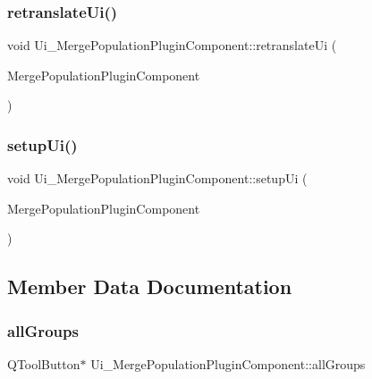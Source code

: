 \subsubsection{\texorpdfstring{retranslateUi()}{retranslateUi()}}
{\footnotesize\ttfamily void Ui\+\_\+\+Merge\+Population\+Plugin\+Component\+::retranslate\+Ui (\begin{DoxyParamCaption}\item[{Q\+Widget $\ast$}]{Merge\+Population\+Plugin\+Component }\end{DoxyParamCaption})\hspace{0.3cm}{\ttfamily [inline]}}

\mbox{\label{class_ui___merge_population_plugin_component_a96660923bcf4f8084e877b65cbbad016}} 
\subsubsection{\texorpdfstring{setupUi()}{setupUi()}}
{\footnotesize\ttfamily void Ui\+\_\+\+Merge\+Population\+Plugin\+Component\+::setup\+Ui (\begin{DoxyParamCaption}\item[{Q\+Widget $\ast$}]{Merge\+Population\+Plugin\+Component }\end{DoxyParamCaption})\hspace{0.3cm}{\ttfamily [inline]}}



\subsection{Member Data Documentation}
\mbox{\label{class_ui___merge_population_plugin_component_a01428cd132c2e7037e9074e06f2bf84f}} 
\subsubsection{\texorpdfstring{allGroups}{allGroups}}
{\footnotesize\ttfamily Q\+Tool\+Button$\ast$ Ui\+\_\+\+Merge\+Population\+Plugin\+Component\+::all\+Groups}

